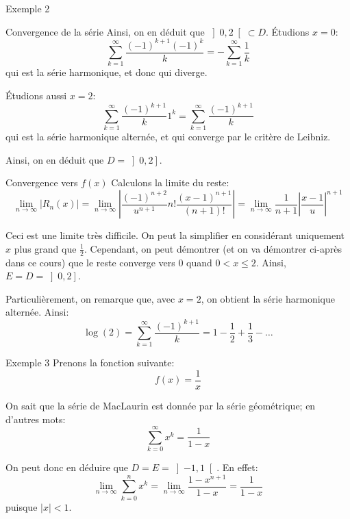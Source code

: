 \documentclass[a4paper]{article}
\begin{document}
\begin{parag}{Exemple 2}
\begin{subparag}{Convergence de la série}
        Ainsi, on en déduit que $\left]0, 2\right[ \subset D$. Étudions $x = 0$: 
        \[\sum_{k=1}^{\infty} \frac{\left(-1\right)^{k+1} \left(-1\right)^k}{k} = -\sum_{k=1}^{\infty} \frac{1}{k}\]
        qui est la série harmonique, et donc qui diverge.

        Étudions aussi $x = 2$: 
        \[\sum_{k=1}^{\infty} \frac{\left(-1\right)^{k+1}}{k} 1^k = \sum_{k=1}^{\infty} \frac{\left(-1\right)^{k+1}}{k}\]
        qui est la série harmonique alternée, et qui converge par le critère de Leibniz.

        Ainsi, on en déduit que $D = \left]0, 2\right] $.
    \end{subparag}
    
    

    \begin{subparag}{Convergence vers $f\left(x\right)$}
        Calculons la limite du reste: 
        \[\lim_{n \to \infty} \left|R_n\left(x\right)\right| = \lim_{n \to \infty} \left|\frac{\left(-1\right)^{n+2}}{u^{n+1}} n! \frac{\left(x-1\right)^{n+1}}{\left(n+1\right)!}\right| = \lim_{n \to \infty} \frac{1}{n+1} \left|\frac{x-1}{u}\right|^{n+1}\]
        
        Ceci est une limite très difficile. On peut la simplifier en considérant uniquement $x$ plus grand que $\frac{1}{2}$. Cependant, on peut démontrer (et on va démontrer ci-après dans ce cours) que le reste converge vers 0 quand $0 < x \leq 2$. Ainsi, $E = D = \left]0, 2\right] $.

        Particulièrement, on remarque que, avec $x = 2$, on obtient la série harmonique alternée. Ainsi: 
        \[\log\left(2\right) = \sum_{k=1}^{\infty} \frac{\left(-1\right)^{k+1}}{k} = 1 - \frac{1}{2} + \frac{1}{3} - \ldots\]
    \end{subparag}
    
\end{parag}

\begin{parag}{Exemple 3}
    Prenons la fonction suivante: 
    \[f\left(x\right) = \frac{1}{x}\]
    
    On sait que la série de MacLaurin est donnée par la série géométrique; en d'autres mots:
    \[\sum_{k=0}^{\infty} x^k = \frac{1}{1 - x}\]

    On peut donc en déduire que $D = E = \left]-1, 1\right[ $. En effet: 
    \[\lim_{n \to \infty} \sum_{k=0}^{n} x^k = \lim_{n \to \infty} \frac{1 - x^{n+1}}{1 - x} = \frac{1}{1 - x}\]
    puisque $\left|x\right| < 1$.
\end{parag}
\end{document}
